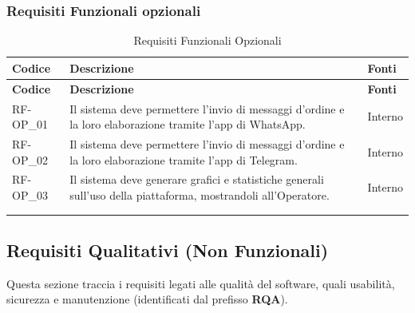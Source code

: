     
\subsubsection{Requisiti Funzionali opzionali}
\renewcommand{\arraystretch}{1.15}
\begin{longtable}{|>{\raggedright}p{}|>{\raggedright\arraybackslash}p{}|>{\raggedright\arraybackslash}p{}|}
    \hline
    \rowcolor[gray]{0.9}
    \textbf{Codice} & \textbf{Descrizione} & \textbf{Fonti} \\
    \hline
    \endfirsthead
    
    \hline
    \rowcolor[gray]{0.9}
    \textbf{Codice} & \textbf{Descrizione} & \textbf{Fonti}  \\
    \hline
    \endhead
    
    \hline
    RF-OP\_01 \hypertarget{rf-op_1} & Il sistema deve permettere l'invio di messaggi d'ordine e la loro elaborazione tramite l'app di WhatsApp. & Interno \\
    \hline
    RF-OP\_02 \hypertarget{rf-op_2} & Il sistema deve permettere l'invio di messaggi d'ordine e la loro elaborazione tramite l'app di Telegram. & Interno \\
    \hline
    RF-OP\_03 \hypertarget{rf-op_3} & Il sistema deve generare grafici e statistiche generali sull'uso della piattaforma, mostrandoli all'Operatore. & Interno \\
    \hline
    \multicolumn{3}{c}{} \\
    \caption{Requisiti Funzionali Opzionali}\hypertarget{tab:funzionali_opzionali}\\

\end{longtable}


\newpage
\subsection{Requisiti Qualitativi (Non Funzionali)}
Questa sezione traccia i requisiti legati alle qualità del software, quali usabilità, sicurezza e manutenzione (identificati dal prefisso \textbf{RQA}).

